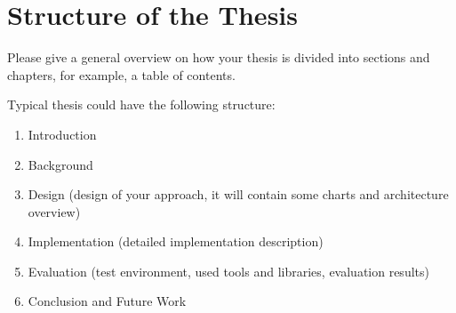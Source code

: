 \chapter{Structure of the Thesis} \label{sec:structure}

Please give a general overview on how your thesis is divided into sections and chapters, for example, a table of contents.

Typical thesis could have the following structure:
\begin{enumerate}
	\item Introduction
	\item Background
	\item Design (design of your approach, it will contain some charts and architecture overview)
	\item Implementation (detailed implementation description)
	\item Evaluation (test environment, used tools and libraries, evaluation results)
	\item Conclusion and Future Work
\end{enumerate}
